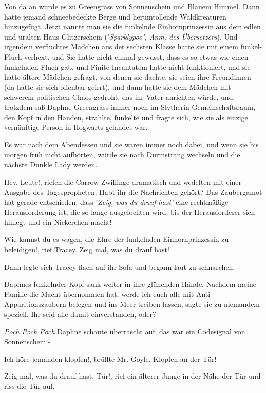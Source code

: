 Von da an wurde es zu Greengrass von Sonnenschein und Blauem Himmel. Dann hatte
jemand schneebedeckte Berge und herumtollende Waldkreaturen hinzugefügt. Jetzt
nannte man sie die funkelnde Einhornprinzessin aus dem edlen und uralten Haus
Glitzerschein ('\emph{Sparklypoo', Anm. des Übersetzers}). Und irgendein
verfluchtes Mädchen aus der sechsten Klasse hatte sie mit einem funkel-Fluch
verhext, und Sie hatte nicht einmal gewusst, dass es so etwas wie einen
funkelnden Fluch gab, und Finite Incantatem hatte nicht funktioniert, und sie
hatte ältere Mädchen gefragt, von denen sie dachte, sie seien ihre Freundinnen
(da hatte sie sich offenbar geirrt), und dann hatte sie dem Mädchen mit schwerem
politischen Chaos gedroht, das ihr Vater anrichten würde, und trotzdem saß
Daphne Greengrass immer noch im Slytherin-Gemeinschaftsraum, den Kopf in den
Händen, strahlte, funkelte und fragte sich, wie sie als einzige vernünftige
Person in Hogwarts gelandet war.

Es war nach dem Abendessen und sie waren immer noch dabei, und wenn sie bis
morgen früh nicht aufhörten, würde sie nach Durmstrang wechseln und die nächste
Dunkle Lady werden.

\glqq{}Hey, Leute!\grqq{}, riefen die Carrow-Zwillinge dramatisch und wedelten
mit einer Ausgabe des Tagespropheten. \glqq{}Habt ihr die Nachrichten gehört? Das
Zaubergamot hat gerade entschieden, dass '\emph{Zeig, was du drauf hast'} eine
rechtmäßige Herausforderung ist, die so lange ausgefochten wird, bis der
Herausforderer sich hinlegt und ein Nickerchen macht!\grqq{}

\glqq{}Wie kannst du es wagen, die Ehre der funkelnden Einhornprinzessin zu
beleidigen!\grqq{}, rief Tracey. \glqq{}Zeig mal, was du drauf hast!\grqq{}

Dann legte sich Tracey flach auf ihr Sofa und begann laut zu schnarchen.

Daphnes funkelnder Kopf sank weiter in ihre glühenden Hände. \glqq{}Nachdem meine
Familie die Macht übernommen hat, werde ich euch alle mit
Anti-Apparitionszaubern belegen und ins Meer treiben lassen\grqq{}, sagte sie zu
niemandem speziell. \glqq{}Ihr seid alle damit einverstanden, oder?\grqq{}

\emph{Poch Poch Poch}
Daphne schaute überrascht auf; das war ein Codesignal von Sonnenschein -

\glqq{}Ich höre jemanden klopfen!\grqq{}, brüllte Mr. Goyle. \glqq{}Klopfen an der
Tür!\grqq{}

\glqq{}Zeig mal, was du drauf hast, Tür!\grqq{}, rief ein älterer Junge in der
Nähe der Tür und riss die Tür auf.

